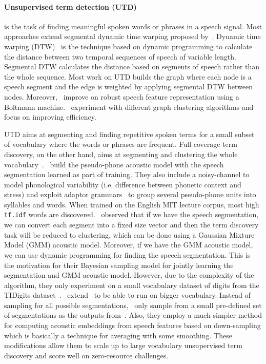 \documentclass[12pt,twoside,final,hidelinks]{ltthesis}
\theoremstyle{definition}
\begin{document}
\paragraph{Unsupervised term detection (UTD)} is the task of finding meaningful spoken words or phrases in a speech signal. Most  approaches extend 
segmental dynamic time warping proposed by~. Dynamic time warping (DTW)~\cite{Berndt:1994:UDT:3000850.3000887} is the technique based on dynamic programming to calculate the 
distance between two temporal sequences of speech of variable length. Segmental DTW calculates the distance based on segments of speech rather than the whole sequence. 
Most work on UTD builds the graph where each node is a speech segment and the 
edge is weighted by applying segmental DTW between nodes. Moreover,~ improve on robust speech feature representation using a Boltmann machine.~ experiment with different graph clustering algorithms and~ focus on improving efficiency. 

UTD aims at segmenting and finding repetitive spoken terms for a small subset of vocabulary where the words or phrases are frequent. Full-coverage term discovery, on 
the other hand, aims at segmenting and clustering the whole vocabulary~\cite{Lee:TACL15,KamperJG16a,Kamper2015FullyUS,RasanenDF15}.~ build 
the pseudo-phone acoustic model with the speech segmentation learned as part of training. They also include a noisy-channel to model  phonological variability (i.e. 
difference between phonetic context and stress) and exploit adaptor grammars~\cite{JohnsonGG06} to group several pseudo-phone units into syllables and words. 
When trained on the English MIT lecture corpus, most high \texttt{tf.idf} words are discovered.~ observed that if we have the speech segmentation, we 
can convert each segment into a fixed size vector and then the term discovery task will be reduced to clustering, which can be done using a Gaussian Mixture Model (GMM) 
acoustic model. Moreover, if we have the GMM acoustic model, we can use dynamic programming for finding the speech segmentation. This is the motivation for their 
Bayesian sampling model for jointly learning the segmentation and GMM acoustic model. However, due to the complexity of the algorithm, they only experiment on a small 
vocabulary dataset of digits from the TIDigits dataset~\cite{Tidigit_dataset}.~ extend~ to be able to run on bigger 
vocabulary. Instead of sampling for all possible segmentations,~ only sample from a small pre-defined set of segmentations as the outputs 
from~. Also, they employ a much simpler method for computing acoustic embeddings from speech features based on down-sampling which is basically a 
technique for averaging with some smoothing. These modifications allow them to scale up to large vocabulary unsupervised term discovery and score well on zero-resource challenges. 
\end{document}
